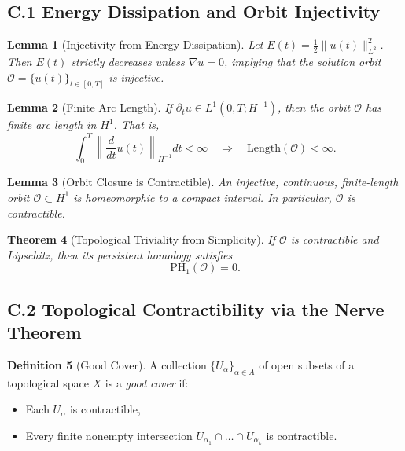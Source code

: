 \documentclass[11pt]{article}
\newtheorem{theorem}{Theorem}[section]
\newtheorem{lemma}[theorem]{Lemma}
\theoremstyle{definition}
\newtheorem{definition}[theorem]{Definition}
\begin{document}
\subsection*{C.1 Energy Dissipation and Orbit Injectivity}

\begin{lemma}[Injectivity from Energy Dissipation]
Let \( E(t) = \frac{1}{2} \|u(t)\|_{L^2}^2 \). Then \( E(t) \) strictly decreases unless \( \nabla u = 0 \), implying that the solution orbit \( \mathcal{O} = \{ u(t) \}_{t \in [0,T]} \) is injective.
\end{lemma}

\begin{lemma}[Finite Arc Length]
If \( \partial_t u \in L^1(0, T; H^{-1}) \), then the orbit \( \mathcal{O} \) has finite arc length in \( H^1 \). That is,
\[
\int_0^T \left\| \frac{d}{dt} u(t) \right\|_{H^{-1}} dt < \infty \quad \Rightarrow \quad \text{Length}(\mathcal{O}) < \infty.
\]
\end{lemma}

\begin{lemma}[Orbit Closure is Contractible]
An injective, continuous, finite-length orbit \( \mathcal{O} \subset H^1 \) is homeomorphic to a compact interval. In particular, \( \mathcal{O} \) is contractible.
\end{lemma}

\begin{theorem}[Topological Triviality from Simplicity]
If \( \mathcal{O} \) is contractible and Lipschitz, then its persistent homology satisfies
\[
\mathrm{PH}_1(\mathcal{O}) = 0.
\]
\end{theorem}

\subsection*{C.2 Topological Contractibility via the Nerve Theorem}

\begin{definition}[Good Cover]
A collection \( \{ U_\alpha \}_{\alpha \in A} \) of open subsets of a topological space \( X \) is a \emph{good cover} if:
\begin{itemize}
  \item Each \( U_\alpha \) is contractible,
  \item Every finite nonempty intersection \( U_{\alpha_1} \cap \dots \cap U_{\alpha_k} \) is contractible.
\end{itemize}
\end{definition}
\end{document}

